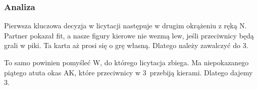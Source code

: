 \documentclass[12pt, a4paper]{article}
\begin{document}
    \subsubsection*{Analiza}
    Pierwsza kluczowa decyzja w licytacji następuje w 
    drugim okrążeniu z ręką N. Partner pokazał fit, a nasze figury kierowe
    nie wezmą lew, jeśli przeciwnicy będą grali w piki.
    Ta karta aż prosi się o grę własną. Dlatego należy zawalczyć do 3\hearts.

    To samo powinien pomyśleć W, do którego licytacja zbiega.
    Ma niepokazanego piątego atuta okas AK, które przeciwnicy w 3\hearts\ 
    przebiją kierami. Dlatego dajemy 3\spades.
\end{document}
